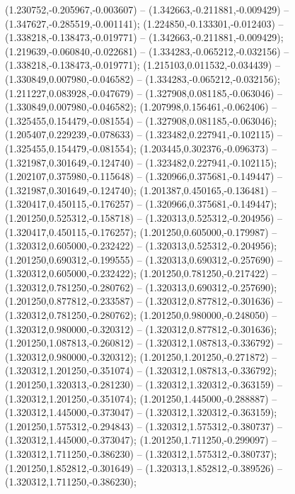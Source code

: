  (1.230752,-0.205967,-0.003607) -- (1.342663,-0.211881,-0.009429) -- (1.347627,-0.285519,-0.001141);
 (1.224850,-0.133301,-0.012403) -- (1.338218,-0.138473,-0.019771) -- (1.342663,-0.211881,-0.009429);
 (1.219639,-0.060840,-0.022681) -- (1.334283,-0.065212,-0.032156) -- (1.338218,-0.138473,-0.019771);
 (1.215103,0.011532,-0.034439) -- (1.330849,0.007980,-0.046582) -- (1.334283,-0.065212,-0.032156);
 (1.211227,0.083928,-0.047679) -- (1.327908,0.081185,-0.063046) -- (1.330849,0.007980,-0.046582);
 (1.207998,0.156461,-0.062406) -- (1.325455,0.154479,-0.081554) -- (1.327908,0.081185,-0.063046);
 (1.205407,0.229239,-0.078633) -- (1.323482,0.227941,-0.102115) -- (1.325455,0.154479,-0.081554);
 (1.203445,0.302376,-0.096373) -- (1.321987,0.301649,-0.124740) -- (1.323482,0.227941,-0.102115);
 (1.202107,0.375980,-0.115648) -- (1.320966,0.375681,-0.149447) -- (1.321987,0.301649,-0.124740);
 (1.201387,0.450165,-0.136481) -- (1.320417,0.450115,-0.176257) -- (1.320966,0.375681,-0.149447);
 (1.201250,0.525312,-0.158718) -- (1.320313,0.525312,-0.204956) -- (1.320417,0.450115,-0.176257);
 (1.201250,0.605000,-0.179987) -- (1.320312,0.605000,-0.232422) -- (1.320313,0.525312,-0.204956);
 (1.201250,0.690312,-0.199555) -- (1.320313,0.690312,-0.257690) -- (1.320312,0.605000,-0.232422);
 (1.201250,0.781250,-0.217422) -- (1.320312,0.781250,-0.280762) -- (1.320313,0.690312,-0.257690);
 (1.201250,0.877812,-0.233587) -- (1.320312,0.877812,-0.301636) -- (1.320312,0.781250,-0.280762);
 (1.201250,0.980000,-0.248050) -- (1.320312,0.980000,-0.320312) -- (1.320312,0.877812,-0.301636);
 (1.201250,1.087813,-0.260812) -- (1.320312,1.087813,-0.336792) -- (1.320312,0.980000,-0.320312);
 (1.201250,1.201250,-0.271872) -- (1.320312,1.201250,-0.351074) -- (1.320312,1.087813,-0.336792);
 (1.201250,1.320313,-0.281230) -- (1.320312,1.320312,-0.363159) -- (1.320312,1.201250,-0.351074);
 (1.201250,1.445000,-0.288887) -- (1.320312,1.445000,-0.373047) -- (1.320312,1.320312,-0.363159);
 (1.201250,1.575312,-0.294843) -- (1.320312,1.575312,-0.380737) -- (1.320312,1.445000,-0.373047);
 (1.201250,1.711250,-0.299097) -- (1.320312,1.711250,-0.386230) -- (1.320312,1.575312,-0.380737);
 (1.201250,1.852812,-0.301649) -- (1.320313,1.852812,-0.389526) -- (1.320312,1.711250,-0.386230);
